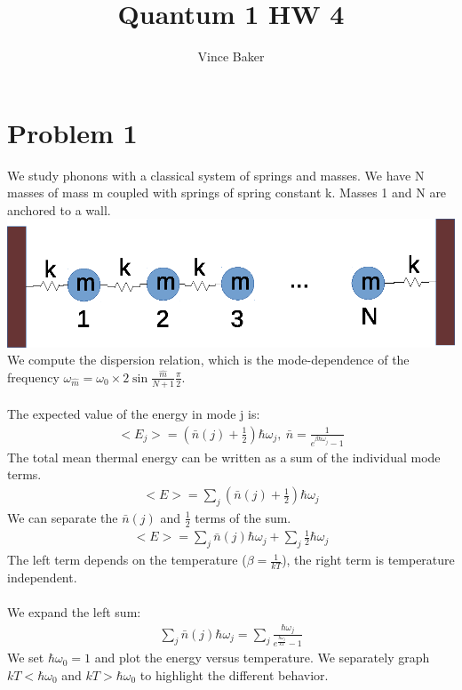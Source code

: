 \documentclass[a4paper,10pt]{article}
\title{Quantum 1 HW 4}
\author{Vince Baker}
\numberwithin{equation}{section}
\begin{document}
\maketitle

\section{Problem 1}
We study phonons with a classical system of springs and masses. 
We have N masses of mass m coupled with springs of spring constant k.
Masses 1 and N are anchored to a wall.\\
\includegraphics{p1}
\\
We compute the dispersion relation, which is the mode-dependence of the frequency $\omega_{\hat{m}}=\omega_0\times2\sin{\frac{\hat{m}}{N+1}\frac{\pi}{2}}$.
\\ \\
The expected value of the energy in mode j is:
\begin{gather}
 <E_j>=(\bar{n}(j)+\frac{1}{2})\hbar \omega_j,\ \bar{n}=\frac{1}{e^{\beta\hbar \omega_j}-1}
\end{gather}
The total mean thermal energy can be written as a sum of the individual mode terms.
\begin{gather}
 <E>=\sum_j(\bar{n}(j)+\frac{1}{2})\hbar \omega_j
\end{gather}
We can separate the $\bar{n}(j)$ and $\frac{1}{2}$ terms of the sum.
\begin{gather}
 <E>=\sum_j\bar{n}(j)\hbar \omega_j+\sum_j \frac{1}{2}\hbar \omega_j
\end{gather}
The left term depends on the temperature ($\beta=\frac{1}{kT}$), the right term is temperature independent.\\ \\
We expand the left sum:
\begin{gather}
 \sum_j\bar{n}(j)\hbar \omega_j=\sum_j \frac{\hbar \omega_j}{e^{\frac{\hbar \omega_j}{kT}}-1}
\end{gather}
We set $\hbar \omega_0=1$ and plot the energy versus temperature.  
We separately graph $kT<\hbar \omega_0$ and $kT>\hbar \omega_0$ to highlight the different behavior.
\end{document}
